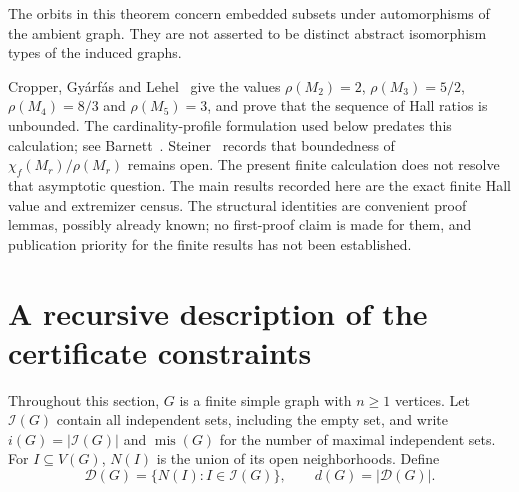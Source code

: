 \documentclass[11pt,letterpaper]{article}
\theoremstyle{remark}
\newcommand{\mi}{\operatorname{mis}}
\newcommand{\ind}{\mathcal I}
\newcommand{\abs}[1]{\lvert #1\rvert}
\begin{document}
The orbits in this theorem concern embedded subsets under automorphisms
of the ambient graph. They are not asserted to be distinct abstract
isomorphism types of the induced graphs.

Cropper, Gy\'arf\'as and Lehel~\cite{CGL} give the values
$\rho(M_2)=2$, $\rho(M_3)=5/2$, $\rho(M_4)=8/3$ and $\rho(M_5)=3$, and prove
that the sequence of Hall ratios is unbounded. The cardinality-profile
formulation used below predates this calculation; see Barnett~\cite{Barnett}.
Steiner~\cite{Steiner} records that boundedness of
$\chi_f(M_r)/\rho(M_r)$ remains open. The present finite calculation does
not resolve that asymptotic question. The main results recorded here are the exact finite Hall value and
extremizer census. The structural identities are convenient proof lemmas,
possibly already known; no first-proof claim is made for them, and
publication priority for the finite results has not been established.

\section{A recursive description of the certificate constraints}
Throughout this section, $G$ is a finite simple graph with $n\ge1$ vertices.
Let $\ind(G)$ contain all independent sets, including the empty set, and
write $i(G)=\abs{\ind(G)}$ and $\mi(G)$ for the number of maximal independent
sets. For $I\subseteq V(G)$, $N(I)$ is the union of its open neighborhoods.
Define
\[
 \mathcal D(G)=\{N(I):I\in\ind(G)\},\qquad d(G)=\abs{\mathcal D(G)}.
\]
\end{document}
